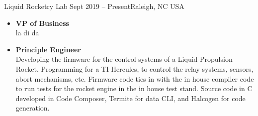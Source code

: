 \documentclass[10pt,a4paper]{altacv}
\begin{document}

\begin{fullwidth}
\makecvheader
\end{fullwidth}




        {Liquid Rocketry Lab}
        {Sept 2019 -- Present}{Raleigh, NC USA}
\begin{itemize}
\item \textbf{VP of Business}\\
    la di da
\item \textbf{Principle Engineer}\\
    Developing the firmware for the control systems of a Liquid Propulsion Rocket. Programming for a TI Hercules, to control the relay systems, sensors, abort mechanisms, etc. Firmware code ties in with the in house compiler code to run tests for the rocket engine in the in house test stand. Source code in C developed in Code Composer, Termite for data CLI, and Halcogen for code
generation.
\end{itemize}
\divider
\end{document}
